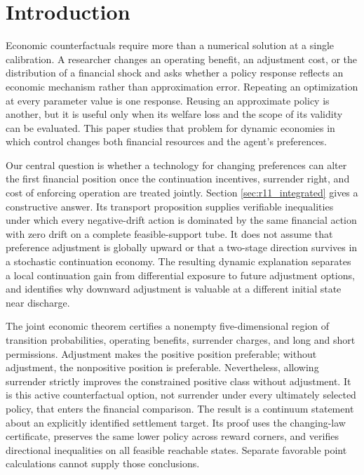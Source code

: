 \section{Introduction}
Economic counterfactuals require more than a numerical solution at a single calibration. A researcher changes an operating benefit, an adjustment cost, or the distribution of a financial shock and asks whether a policy response reflects an economic mechanism rather than approximation error. Repeating an optimization at every parameter value is one response. Reusing an approximate policy is another, but it is useful only when its welfare loss and the scope of its validity can be evaluated. This paper studies that problem for dynamic economies in which control changes both financial resources and the agent's preferences.

Our central question is whether a technology for changing preferences can alter the first financial position once the continuation incentives, surrender right, and cost of enforcing operation are treated jointly. Section \ref{sec:r11_integrated} gives a constructive answer. Its transport proposition supplies verifiable inequalities under which every negative-drift action is dominated by the same financial action with zero drift on a complete feasible-support tube. It does not assume that preference adjustment is globally upward or that a two-stage direction survives in a stochastic continuation economy. The resulting dynamic explanation separates a local continuation gain from differential exposure to future adjustment options, and identifies why downward adjustment is valuable at a different initial state near discharge.

The joint economic theorem certifies a nonempty five-dimensional region of transition probabilities, operating benefits, surrender charges, and long and short permissions. Adjustment makes the positive position preferable; without adjustment, the nonpositive position is preferable. Nevertheless, allowing surrender strictly improves the constrained positive class without adjustment. It is this active counterfactual option, not surrender under every ultimately selected policy, that enters the financial comparison. The result is a continuum statement about an explicitly identified settlement target. Its proof uses the changing-law certificate, preserves the same lower policy across reward corners, and verifies directional inequalities on all feasible reachable states. Separate favorable point calculations cannot supply those conclusions.

